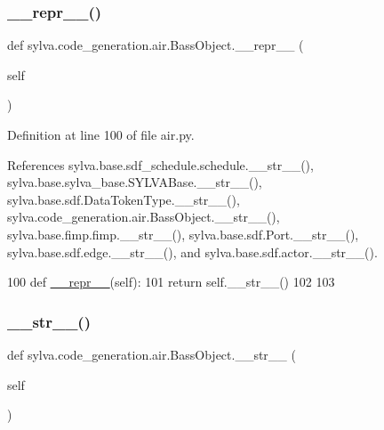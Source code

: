 \subsubsection{\texorpdfstring{\+\_\+\+\_\+repr\+\_\+\+\_\+()}{\_\_repr\_\_()}}
{\footnotesize\ttfamily def sylva.\+code\+\_\+generation.\+air.\+Bass\+Object.\+\_\+\+\_\+repr\+\_\+\+\_\+ (\begin{DoxyParamCaption}\item[{}]{self }\end{DoxyParamCaption})\hspace{0.3cm}{\ttfamily [inherited]}}



Definition at line 100 of file air.\+py.



References sylva.\+base.\+sdf\+\_\+schedule.\+schedule.\+\_\+\+\_\+str\+\_\+\+\_\+(), sylva.\+base.\+sylva\+\_\+base.\+S\+Y\+L\+V\+A\+Base.\+\_\+\+\_\+str\+\_\+\+\_\+(), sylva.\+base.\+sdf.\+Data\+Token\+Type.\+\_\+\+\_\+str\+\_\+\+\_\+(), sylva.\+code\+\_\+generation.\+air.\+Bass\+Object.\+\_\+\+\_\+str\+\_\+\+\_\+(), sylva.\+base.\+fimp.\+fimp.\+\_\+\+\_\+str\+\_\+\+\_\+(), sylva.\+base.\+sdf.\+Port.\+\_\+\+\_\+str\+\_\+\+\_\+(), sylva.\+base.\+sdf.\+edge.\+\_\+\+\_\+str\+\_\+\+\_\+(), and sylva.\+base.\+sdf.\+actor.\+\_\+\+\_\+str\+\_\+\+\_\+().


\begin{DoxyCode}
100     \textcolor{keyword}{def }\hyperlink{namespacesylva_1_1code__generation_1_1floorplanner_a84f24b1e40f5425e9bb40ab45ccbd10f}{\_\_repr\_\_}(self):
101         \textcolor{keywordflow}{return} self.\_\_str\_\_()
102 
103 
\end{DoxyCode}
\mbox{\label{classsylva_1_1code__generation_1_1air_1_1_bass_object_a2c164720220479369c29db97b67aabe8}} 
\subsubsection{\texorpdfstring{\+\_\+\+\_\+str\+\_\+\+\_\+()}{\_\_str\_\_()}}
{\footnotesize\ttfamily def sylva.\+code\+\_\+generation.\+air.\+Bass\+Object.\+\_\+\+\_\+str\+\_\+\+\_\+ (\begin{DoxyParamCaption}\item[{}]{self }\end{DoxyParamCaption})\hspace{0.3cm}{\ttfamily [inherited]}}



